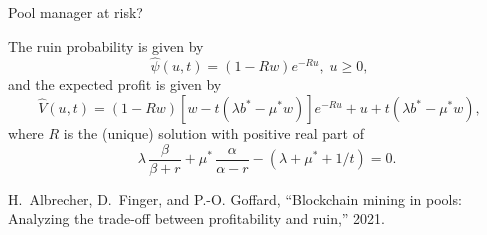 \documentclass{beamer}
\def \w{\widehat}
\begin{document}
\begin{frame}{Pool manager at risk?}
\scriptsize
\begin{tcolorbox}[enhanced,drop shadow, title=Theorem (Profit and ruin of the pool manager)]
The ruin probability is given by 
\begin{equation*}\label{psiexpe}
    \widehat{\psi}(u,t) = (1-Rw)  e^{-R u},\;u\ge 0,
\end{equation*}
and the expected profit is given by
\begin{equation*}\label{Vcombexpe}
    \w{V}(u,t) = (1 - Rw)[w-t(\lambda b^\ast-\mu^\ast w)] e^{-R u}+u+t(\lambda b^\ast-\mu^\ast w),
\end{equation*}
where $R$ is the (unique) solution with positive real part of 
\begin{equation*} \label{VLunde}
  \quad 
  \lambda  \,\frac{\beta}{\beta+ r}+\mu^\ast\,  \frac{\alpha}{\alpha -r} -(\lambda+\mu^\ast+1/t)=0.
\end{equation*}
\end{tcolorbox}
\tiny
  \begin{thebibliography}{1}

H.~Albrecher, D.~Finger, and P.-O. Goffard, ``Blockchain mining in pools:
  Analyzing the trade-off between profitability and ruin,'' 2021.


\end{thebibliography}
\end{frame}
\end{document}
